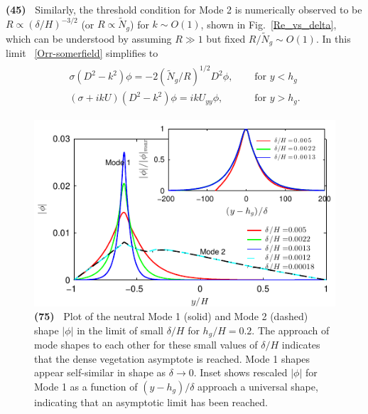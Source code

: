 \documentclass[aps,prl,reprint,twocolumn,superscriptaddress,sort&compress,10pt]{revtex4-1}  %
\newcommand{\hg}{h_g}
\newcommand{\Rey}{{R}}
\newcommand{\Ndg}{\tilde{N}_g}
\newcommand{\words}[1]{\textbf{(#1)~}}
\begin{document}
\words{45} Similarly, the threshold condition for Mode 2 is numerically observed to be $\Rey \propto ({\delta}/{H})^{-3/2}$ (or $\Rey \propto \Ndg$) for $k\sim O(1)$, shown in Fig.~\ref{Re_vs_delta}, which can be understood by assuming $\Rey \gg 1$ but fixed $\Rey/\Ndg \sim O(1)$.
In this limit ~\eqref{Orr-somerfield} simplifies to 
\begin{align}
\begin{split}
\sigma\left(D^2-k^2\right)\phi = -2{(\Ndg/\Rey)^{1/2}}D^2\phi,  \quad &\text{ for $y<\hg$}  \\
\left(\sigma+ikU\right) \left(D^2-k^2\right)\phi =  ikU_{yy}\phi, \quad &\text{ for $y>\hg$}.
\end{split}
\label{eqn:mode2asymp}
\end{align}
\begin{figure}
\includegraphics[]{Asymptotic_noshear}
\caption{
\words{75} Plot of the neutral Mode 1 (solid) and Mode 2 (dashed) shape $|\phi|$ in the limit of small $\delta/H$ for $\hg/H=0.2$. 
The approach of mode shapes to each other for these small values of $\delta/H$ indicates that the dense vegetation asymptote is reached. 
Mode 1 shapes appear self-similar in shape as $\delta\to 0$.
Inset shows rescaled $|\phi|$ for Mode 1 as a function of $(y-\hg)/\delta$ approach a universal shape, indicating that an asymptotic limit has been reached. 
}
\label{Asymptotic_mode}
\end{figure}
\end{document}
